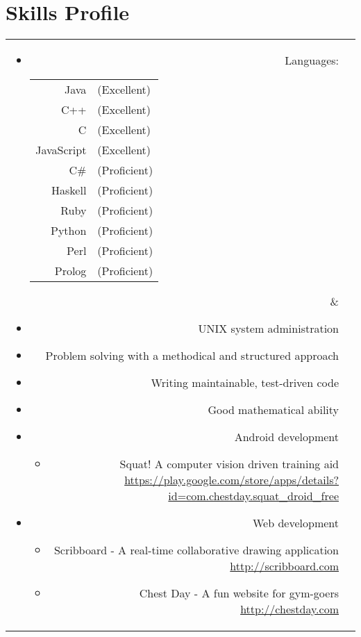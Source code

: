\section*{Skills Profile}

\begin{tabular}{rl}

\parbox[t]{0.3\textwidth}{
	\begin{itemize}
		\item Languages:
		\begin{tabular}[h]{rl}
			Java & (Excellent)\\
			C++ & (Excellent)\\
			C & (Excellent)\\
			JavaScript & (Excellent)\\
			C\# & (Proficient)\\
			Haskell & (Proficient)\\
			Ruby & (Proficient)\\
			Python & (Proficient)\\
			Perl & (Proficient)\\
			Prolog & (Proficient)
		\end{tabular}
	\end{itemize}}
&
\parbox[t]{0.6\textwidth}{
	\begin{itemize}
		\item UNIX system administration
		\item Problem solving with a methodical and structured approach
		\item Writing maintainable, test-driven code
		\item Good mathematical ability
		\item Android development
			\begin{itemize}
				\item Squat! A computer vision driven training aid\\
				\url{https://play.google.com/store/apps/details?id=com.chestday.squat_droid_free}
			\end{itemize}
		\item Web development
			\begin{itemize}
				\item Scribboard - A real-time collaborative drawing application\\
				\url{http://scribboard.com}
				\item Chest Day - A fun website for gym-goers\\
				\url{http://chestday.com}
			\end{itemize}
	\end{itemize}}\\

\end{tabular}